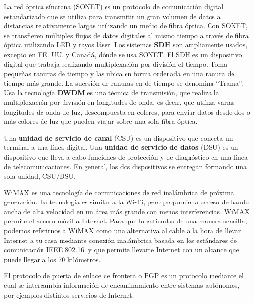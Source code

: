 \documentclass[
	12pt, %
	fleqn, %
	a4paper, %
	oneside, %
]{LegrandOrangeBook}
\begin{document}
\begin{definition}[SONET]
La red óptica síncrona (SONET) es un protocolo de comunicación digital estandarizado que se utiliza para transmitir un gran volumen de datos a distancias relativamente largas utilizando un medio de fibra óptica. Con SONET, se transfieren múltiples flujos de datos digitales al mismo tiempo a través de fibra óptica utilizando LED y rayos láser. Los sistemas \textbf{SDH} son ampliamente usados, excepto en EE. UU. y Canadá, dónde se usa SONET. El SDH es un dispositivo digital que trabaja realizando multiplexación por división el tiempo. Toma pequeñas ranuras de tiempo y las ubica en forma ordenada en una ranura de tiempo más grande. La sucesión de ranuras en de tiempo se denomina “Trama”. Usa la tecnología \textbf{DWDM} es una técnica de transmisión, que realiza la multiplexación por división en longitudes de onda, es decir, que utiliza varias longitudes de onda de luz, descompuesta en colores, para enviar datos desde dos o más colores de luz que pueden viajar sobre una sola fibra óptica.
\end{definition}
\begin{definition}
Una \textbf{unidad de servicio de canal} (CSU) es un dispositivo que conecta un terminal a una línea digital. Una \textbf{unidad de servicio de datos} (DSU) es un dispositivo que lleva a cabo funciones de protección y de diagnóstico en una línea de telecomunicaciones. En general, los dos dispositivos se entregan formando una sola unidad, CSU/DSU.
\end{definition}
\begin{definition}[WiMAX]
WiMAX es una tecnología de comunicaciones de red inalámbrica de próxima generación. La tecnología es similar a la Wi-Fi, pero proporciona acceso de banda ancha de alta velocidad en un área más grande con menos interferencias. WiMAX permite el acceso móvil a Internet. Para que lo entiendas de una manera sencilla, podemos referirnos a WiMAX como una alternativa al cable a la hora de llevar Internet a tu casa mediante conexión inalámbrica basada en los estándares de comunicación IEEE 802.16, y que permite llevarte Internet con un alcance que puede llegar a los 70 kilómetros.
\end{definition}
\begin{definition}[BGP]
El protocolo de puerta de enlace de frontera o BGP es un protocolo mediante el cual se intercambia información de encaminamiento entre sistemas autónomos, por ejemplos distintos servicios de Internet.
\end{definition}
\end{document}
